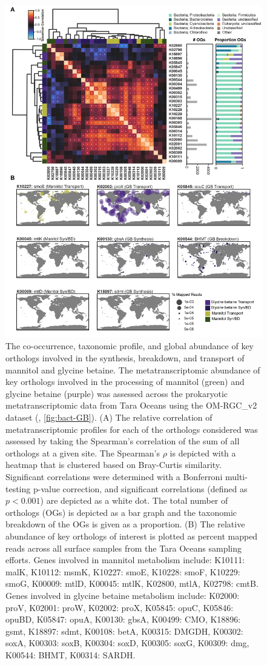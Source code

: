\documentclass[utf8]{frontiersSCNS} %
\begin{document}
\begin{figure}[h!]
    \centering
\includegraphics[width=0.75\columnwidth]{Figures/Tara-composite-01.png}
    \caption{The co-occurrence, taxonomic profile, and global abundance of key orthologs involved in the synthesis, breakdown, and transport of mannitol and glycine betaine. The metatranscriptomic abundance of key orthologs involved in the processing of mannitol (green) and glycine betaine (purple) was assessed across the prokaryotic metatranscriptomic data from Tara Oceans using the OM-RGC\_v2 dataset (, \ref{fig:bact-GB}). (A) The relative correlation of metatranscriptomic profiles for each of the orthologs considered was assessed by taking the Spearman's correlation of the sum of all orthologs at a given site. The Spearman's $\rho$ is depicted with a heatmap that is clustered based on Bray-Curtis similarity. Significant correlations were determined with a Bonferroni multi-testing p-value correction, and significant correlations (defined as $p<0.001$) are depicted as a white dot. The total number of orthologs (OGs) is depicted as a bar graph and the taxonomic breakdown of the OGs is given as a proportion. (B) The relative abundance of key orthologs of interest is plotted as percent mapped reads across all surface samples from the Tara Oceans sampling efforts. Genes involved in mannitol metabolism include: K10111: malK, K10112: msmK, K10227: smoE, K10228: smoF, K10229: smoG, K00009: mtlD, K00045: mtlK, K02800, mtlA, K02798: cmtB. Genes involved in glycine betaine metabolism include: K02000: proV, K02001: proW,   K02002: proX,  K05845: opuC, K05846: opuBD, K05847: opuA, K00130: gbsA, K00499: CMO, K18896: gsmt, K18897: sdmt, K00108: betA, K00315: DMGDH, K00302: soxA, K00303: soxB, K00304: soxD, K00305: soxG, K00309: dmg, K00544: BHMT, K00314: SARDH.   }
    \label{fig:tarabact}
\end{figure}
\end{document}
